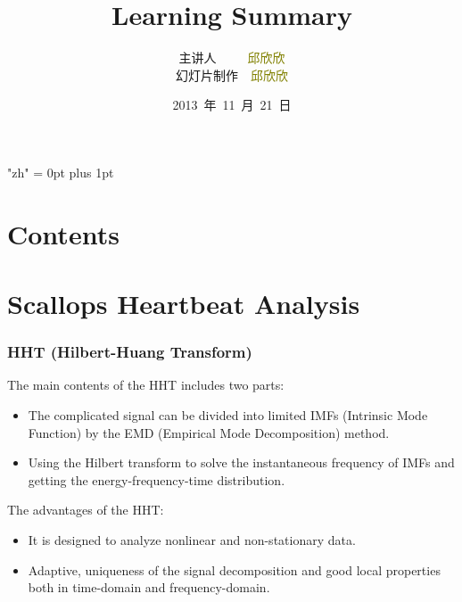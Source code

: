 \documentclass[notheorems,mathserif,table,compress]{beamer}  %
\begin{document}
\XeTeXlinebreaklocale "zh"         %
\XeTeXlinebreakskip = 0pt plus 1pt %


\title{Learning Summary}
\author[qiu]{主讲人~~~~~\textcolor{olive}{邱欣欣}\\
    \quad 幻灯片制作~~\textcolor{olive}{邱欣欣}}
\institute[中国海洋大学]{\small\textcolor{violet}{中国海洋大学~~信息科学与工程学院}}
\date{2013~年~11~月~21~日}
\frame{ \titlepage }
\section*{Contents}
\section{Scallops Heartbeat Analysis}

%
\begin{frame}
\frametitle{HHT (Hilbert-Huang Transform)}
The main contents of the HHT includes two parts:
\begin{itemize}
\item The complicated signal can be divided into limited IMFs (Intrinsic Mode Function) by the EMD (Empirical Mode Decomposition) method.
\item Using the Hilbert transform to solve the instantaneous frequency of IMFs and getting the energy-frequency-time distribution.
\end{itemize}
The advantages of the HHT:
\begin{itemize}
\item It is designed to analyze nonlinear and non-stationary data.
\item Adaptive, uniqueness of the signal decomposition and good local properties both in time-domain and frequency-domain.
\end{itemize}
\end{frame}
\end{document}
